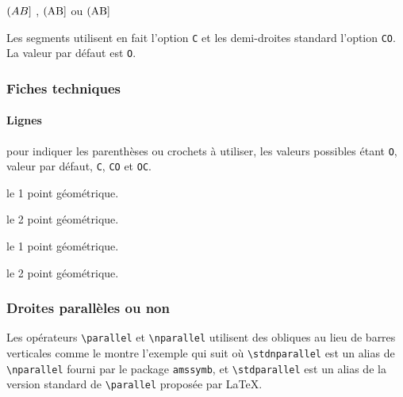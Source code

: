 \documentclass[12pt,a4paper]{article}
\begin{document}
\begin{latexex}
$\gline[OC]{A}{B}$ ,
$\gline[OC]{\pt{A}}{\pt{B}}$ ou
$\pgline[OC]{A}{B}$
\end{latexex}


\begin{remark}
	Les segments utilisent en fait l'option \verb+C+ et les demi-droites standard l'option \verb+CO+.
	La valeur par défaut est \verb+O+.
\end{remark}




\subsubsection{Fiches techniques}

\paragraph{Lignes}



\IDoption{} pour indiquer les parenthèses ou crochets à utiliser, les valeurs possibles étant \verb+O+, valeur par défaut, \verb+C+, \verb+CO+ et \verb+OC+.

 le 1\ier{} point géométrique.

 le 2\ieme{} point géométrique.


\separation




\extraspace



 le 1\ier{} point géométrique.

 le 2\ieme{} point géométrique.




\subsubsection{Droites parallèles ou non}

Les opérateurs \verb+\parallel+ et \verb+\nparallel+ utilisent des obliques au lieu de barres verticales comme le montre l'exemple qui suit où \verb+\stdnparallel+ est un alias de \verb+\nparallel+ fourni par le package \verb+amssymb+, et \verb+\stdparallel+ est un alias de la version standard de \verb+\parallel+ proposée par \LaTeX{}.
\end{document}
